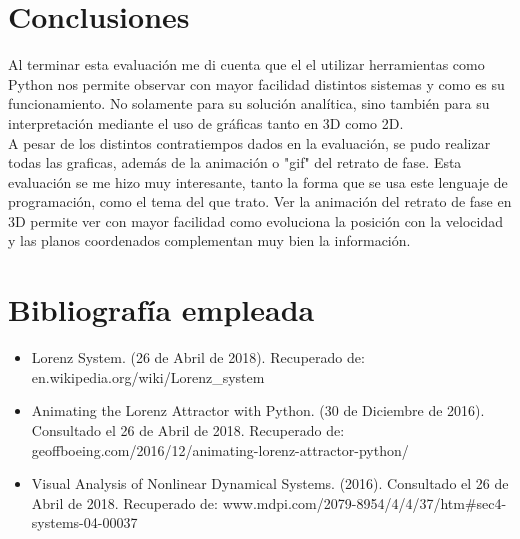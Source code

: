 \documentclass[12pt]{article}
\begin{document}
\section{Conclusiones}
Al terminar esta evaluación me di cuenta que el el utilizar herramientas como Python nos permite observar con mayor facilidad distintos sistemas y como es su funcionamiento. No solamente para su solución analítica, sino también para su interpretación mediante el uso de gráficas tanto en 3D como 2D. \\

A pesar de los distintos contratiempos dados en la evaluación, se pudo realizar todas las graficas, además de la animación o "gif" del retrato de fase. Esta evaluación se me hizo muy interesante, tanto la forma que se usa este lenguaje de programación, como el tema del que trato. Ver la animación del retrato de fase en 3D permite ver con mayor facilidad como evoluciona la posición con la velocidad y las planos coordenados complementan muy bien la información.

\section{Bibliografía empleada}
\begin{itemize}
    \item Lorenz System. (26 de Abril de 2018). Recuperado de: en.wikipedia.org/wiki/Lorenz\_system
    \item Animating the Lorenz Attractor with Python. (30 de Diciembre de 2016). Consultado el 26 de Abril de 2018. Recuperado de: geoffboeing.com/2016/12/animating-lorenz-attractor-python/
    
    \item Visual Analysis of Nonlinear Dynamical Systems. (2016).  Consultado el 26 de Abril de 2018. Recuperado de: www.mdpi.com/2079-8954/4/4/37/htm\#sec4-systems-04-00037
\end{itemize}
\end{document}
